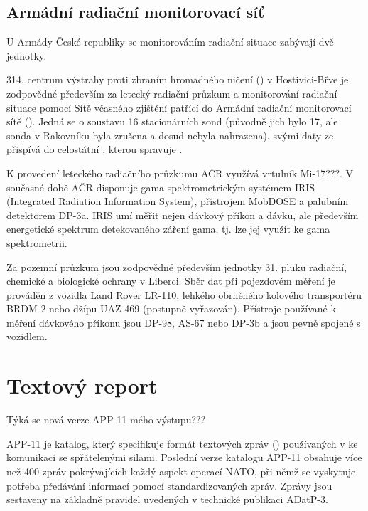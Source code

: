 \subsection{Armádní radiační monitorovací síť}	
	
	
	U Armády České republiky se monitorováním radiační situace zabývají dvě jednotky. 
	 
	 314. centrum výstrahy proti zbraním hromadného ničení () v Hostivici-Břve je zodpovědné především za letecký radiační průzkum a monitorování radiační situace pomocí Sítě včasného zjištění patřící do Armádní radiační monitorovací sítě (). Jedná se o soustavu 16 stacionárních sond (původně jich bylo 17, ale sonda v Rakovníku byla zrušena a dosud nebyla nahrazena).  svými daty ze  přispívá do celostátní , kterou spravuje .
	 
	 K provedení leteckého radiačního průzkumu AČR využívá vrtulník Mi-17???. V současné době AČR disponuje gama spektrometrickým systémem IRIS (Integrated Radiation Information System), přístrojem MobDOSE a palubním detektorem DP-3a. IRIS umí měřit nejen dávkový příkon a dávku, ale především energetické spektrum detekovaného záření gama, tj. lze jej využít ke gama spektrometrii.
	
	 Za pozemní průzkum jsou zodpovědné především jednotky 31. pluku radiační, chemické a biologické ochrany v Liberci. Sběr dat při pojezdovém měření je prováděn z vozidla Land Rover LR-110, lehkého obrněného kolového transportéru BRDM-2 nebo džípu UAZ-469 (postupně vyřazován). Přístroje používané k měření dávkového příkonu jsou DP-98, AS-67 nebo DP-3b a jsou pevně spojené s vozidlem. 
	 
\section{Textový report}

Týká se nová verze APP-11 mého výstupu???

APP-11 je katalog, který specifikuje formát textových zpráv () používaných v  ke komunikaci se spřátelenými silami. Poslední verze katalogu APP-11 obsahuje více než 400 zpráv pokrývajících každý aspekt operací NATO, při němž se vyskytuje potřeba předávání informací pomocí standardizovaných zpráv. Zprávy jsou sestaveny na základně pravidel uvedených v technické publikaci ADatP-3. 

